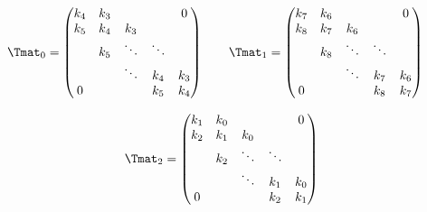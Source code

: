 
\begin{equation*}
  \Tmat_0 = \leftmatrix
    k_4 & k_3 &         &         & 0       \\
    k_5 & k_4 & k_3 &         &         \\
            & k_5 & \ddots  & \ddots  &         \\
            &         & \ddots  & k_4 & k_3 \\
    0       &         &         & k_5 & k_4
  \rightmatrix \quad \quad
  \hfill
  \Tmat_1 = \leftmatrix
    k_7 & k_6 &         &         & 0       \\
    k_8 & k_7 & k_6 &         &         \\
            & k_8 & \ddots  & \ddots  &         \\
            &         & \ddots  & k_7 & k_6 \\
    0       &         &         & k_8 & k_7 \\
  \rightmatrix \quad
\end{equation*}

\begin{equation*}
  \Tmat_2 = \leftmatrix
    k_1 & k_0 &         &         & 0       \\
    k_2 & k_1 & k_0 &         &         \\
            & k_2 & \ddots  & \ddots  &         \\
            &         & \ddots  & k_1 & k_0 \\
    0       &         &         & k_2 & k_1 \\
  \rightmatrix
\end{equation*}


